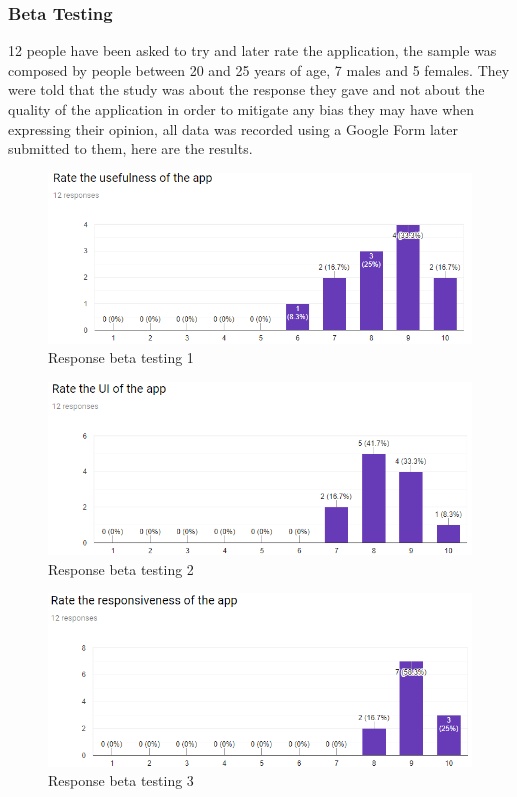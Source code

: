 \subsubsection{Beta Testing}\vspace{-0.2cm}
12 people have been asked to try and later rate the application, the sample was composed by people between 20 and 25 years of age, 7 males and 5 females. They were told that the study was about the response they gave and not about the quality of the application in order to mitigate any bias they may have when expressing their opinion, all data was recorded using a Google Form later submitted to them, here are the results.
\begin{figure}[h]
\centering
  \includegraphics[width=.75\textwidth, keepaspectratio=true]{Img/Beta1}
\caption{Response beta testing 1}
\end{figure}
\vspace{-0.2cm}
\begin{figure}[h]
\centering
  \includegraphics[width=.75\textwidth, keepaspectratio=true]{Img/Beta2}
\caption{Response beta testing 2}
\end{figure}
\vspace{-0.2cm}
\begin{figure}[h]
\centering
  \includegraphics[width=.75\textwidth, keepaspectratio=true]{Img/Beta3}
\caption{Response beta testing 3}
\end{figure}
